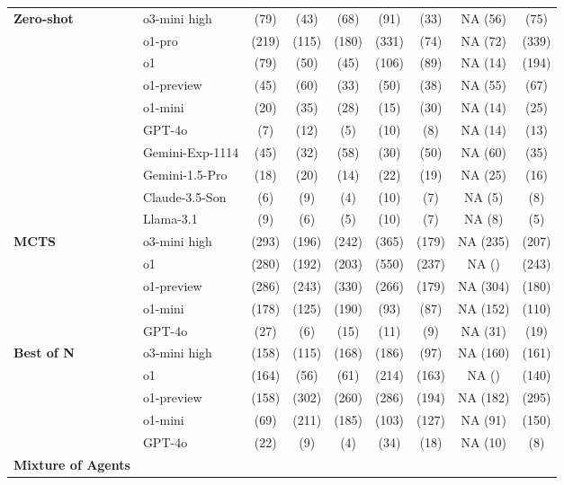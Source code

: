 \begin{table}[H]
\begin{tabular}{llccccccc}
\midrule
\textbf{Zero-shot} 
& o3-mini high & \X (79) & \X (43) & \X (68) & \C (91) & \X (33) & NA (56) & \X (75) \\
& o1-pro & \X (219) & \X (115) & \X (180) & \C (331) & \X (74) & NA (72) & \C (339) \\
& o1 & \X (79) & \X (50) & \X (45) & \C (106) & \X (89) & NA (14) & \X (194) \\
& o1-preview & \X (45) & \X (60) & \X (33) & \X (50) & \X (38) & NA (55) & \X (67)\\
& o1-mini & \X (20) & \X (35) & \X (28) & \X (15) & \X (30) & NA (14) & \X (25)\\
& GPT-4o & \X (7) & \X (12) & \X (5) & \X (10) & \X (8) & NA (14) & \X (13)\\
& Gemini-Exp-1114 & \X (45) & \X (32) & \X (58) & \X (30) & \X (50) & NA (60) & \X (35)\\
& Gemini-1.5-Pro & \X (18) & \X (20) & \X (14) & \X (22) & \X (19) & NA (25) & \X (16)\\
& Claude-3.5-Son & \X (6) & \X (9) & \X (4) & \X (10) & \X (7) & NA (5) & \X (8)\\
& Llama-3.1 & \X (9) & \X (6) & \X (5) & \X (10) & \X (7) & NA (8) & \X (5)\\
\midrule
\textbf{MCTS} 
& o3-mini high & \X (293) & \C (196) & \X (242) & \X (365) & \X (179) & NA (235) & \X (207) \\
& o1 & \X (280) & \X (192) & \X (203) & \C (550) & \X (237) & NA () & \X (243) \\
& o1-preview & \X (286) & \X (243) & \X (330) & \X (266) & \X (179) & NA (304) & \X (180)\\
& o1-mini & \X (178) & \X (125) & \X (190) & \X (93) & \X (87) & NA (152) & \X (110)\\
& GPT-4o & \X (27) & \X (6) & \X (15) & \X (11) & \X (9) & NA (31) & \X (19)\\
\midrule
\textbf{Best of N} 
& o3-mini high & \C (158) & \X (115) & \X (168) & \C (186) & \X (97) & NA (160) & \X (161) \\
& o1 & \C (164) & \X (56) & \X (61) & \C (214) & \X (163) & NA () & \X (140) \\
& o1-preview & \X (158) & \X (302) & \X (260) & \X (286) & \X (194) & NA (182) & \X (295)\\
& o1-mini & \X (69) & \X (211) & \X (185) & \X (103) & \X (127) & NA (91) & \X (150)\\
& GPT-4o & \X (22) & \X (9) & \X (4) & \X (34) & \X (18) & NA (10) & \X (8)\\
\midrule
\textbf{Mixture of Agents} 

\end{tabular}
\end{table}
